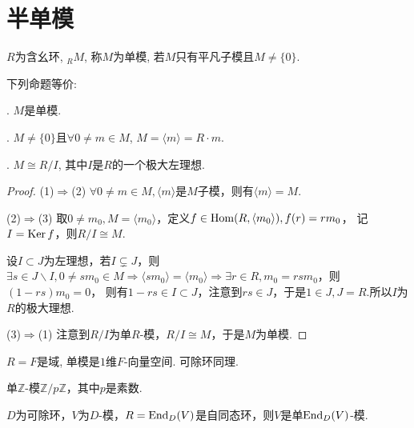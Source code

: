 \section{半单模}
\begin{definition}
    $R$为含幺环, $_RM$, 称$M$为单模, 若$M$只有平凡子模且$M\neq \{0\}$.
\end{definition}

\begin{proposition} 下列命题等价:\par
    . $M$是单模.\par
    . $M\neq \{0\}$且$\forall 0\neq m\in M$, 
    $M=\langle m\rangle=R\cdot m$.\par
    . $M\cong R/I$, 其中$I$是$R$的一个极大左理想.

\end{proposition}
\begin{proof}
(1)$\Rightarrow$(2)
$\forall 0\neq m\in M,\langle m\rangle$是$M$子模，则有$\langle m\rangle=M$.

(2)$\Rightarrow$(3)
取$0\neq m_0,M=\langle m_0\rangle$，定义$f\in \operatorname{Hom}(R,\langle m_0\rangle),f(r)=rm_0$，
记$I=\operatorname{Ker} f$，则$R/I\cong M$.

设$I\subset J$为左理想，若$I\subsetneq J$，则$\exists s\in J\backslash I,
0\neq sm_0\in M\Rightarrow \langle sm_0\rangle=\langle m_0\rangle
\Rightarrow \exists r\in R,m_0=rsm_0$，则$(1-rs)m_0=0$，
则有$1-rs\in I \subset J$，注意到$rs\in J$，于是$1\in J,J=R$.所以$I$为$R$的极大理想.

(3)$\Rightarrow$(1)
注意到$R/I$为单$R$-模，$R/I \cong M$，于是$M$为单模.
\end{proof}
\begin{example}
    $R=F$是域, 单模是$1$维$F$-向量空间. 可除环同理.
\end{example}

\begin{example}
    单$\mathbb{Z}$-模$\mathbb{Z}/p\mathbb{Z}$，其中$p$是素数.
\end{example}

\begin{example}
    $D$为可除环，$V$为$D$-模，$R=\operatorname{End}_D(V)$是自同态环，则$V$是单$\operatorname{End}_D(V)$-模.
\end{example}

